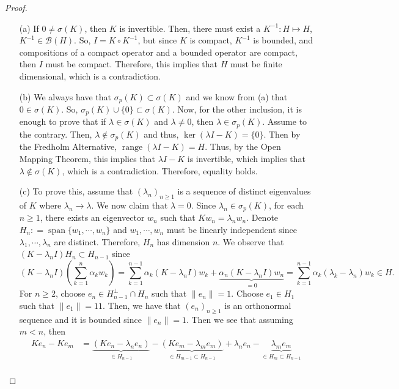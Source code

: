 \documentclass[12pt]{article}
\newcommand{\B}{\mathscr{B}}
\DeclareMathOperator{\range}{range}
\newcommand{\suml}{\sum\limits}
\newcommand{\sumkn}{\sum\limits_{k = 1}^{n}}
\newcommand{\sbs}{\subset}
\DeclareMathOperator*{\spa}{span}
\begin{document}
\begin{proof}
\begin{enumerate}
\item[(a)] If $0 \neq \sigma(K)$, then $K$ is invertible. Then, there must exist a $K^{-1} : H \mapsto H$, $K^{-1} \in \B(H)$. So, $I = K \circ K^{-1}$, but since $K$ is compact, $K^{-1}$ is bounded, and compositions of a compact operator and a bounded operator are compact, then $I$ must be compact. Therefore, this implies that $H$ must be finite dimensional, which is a contradiction. 
\item[(b)] We always have that $\sigma_p(K) \sbs \sigma(K)$ and we know from (a) that $0 \in \sigma(K)$. So, $\sigma_p(K) \cup \{ 0 \} \sbs \sigma(K)$. Now, for the other inclusion, it is enough to prove that if $\lambda \in \sigma(K)$ and $\lambda \neq 0$, then $\lambda \in \sigma_p(K)$. Assume to the contrary. Then, $\lambda \not\in \sigma_p(K)$ and thus, $\ker(\lambda I - K) = \{ 0 \}$. Then by the Fredholm Alternative, $\range(\lambda I - K) = H$. Thus, by the Open Mapping Theorem, this implies that $\lambda I - K$ is invertible, which implies that $\lambda \not\in \sigma(K)$, which is a contradiction. Therefore, equality holds.
\item[(c)] To prove this, assume that $(\lambda_n)_{n \geq 1}$ is a sequence of distinct eigenvalues of $K$ where $\lambda_n \to \lambda$. We now claim that $\lambda = 0$. Since $\lambda_n \in \sigma_p(K)$, for each $n \geq 1$, there exists an eigenvector $w_n$ such that $K w_n = \lambda_n w_n$. Denote $H_n : = \spa\{ w_1, \cdots, w_n \}$ and $w_1, \cdots, w_n$ must be linearly independent since $\lambda_1, \cdots, \lambda_n$ are distinct. Therefore, $H_n$ has dimension $n$. We observe that $(K - \lambda_n I) H_n \sbs H_{n-1}$ since 
\[ (K - \lambda_n I) \left( \sumkn \alpha_k w_k \right) = \suml_{k = 1}^{n-1} \alpha_k (K - \lambda_n I) w_k + \underbrace{\alpha_n (K - \lambda_n I) w_n}_{= 0} = \suml_{k = 1}^{n-1} \alpha_k (\lambda_k - \lambda_n)  w_k  \in H. \]
For $n \geq 2$, choose $e_n \in H_{n-1}^{\perp} \cap H_n$ such that $\| e_n \| = 1$. Choose $e_1 \in H_1$ such that $\| e_1 \| = 11$. Then, we have that $(e_n)_{n \geq 1}$ is an orthonormal sequence and it is bounded since $\| e_n \| = 1$. Then we see that assuming $m < n$, then 
\begin{align*}
Ke_n - Ke_m & = \underbrace{(Ke_n - \lambda_n e_n)}_{\in H_{n-1}} -  \underbrace{(K e_m - \lambda_m e_m)}_{\in H_{m -1} \sbs H_{n - 1}} + \lambda_n e_n -  \underbrace{\lambda_m e_m}_{\in H_m \sbs H_{n -1}} \\

\end{align*}
\end{enumerate}
\end{proof}
\end{document}
